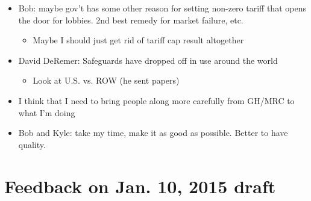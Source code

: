 \documentclass[12pt]{article}
\begin{document}
\begin{itemize}
\begin{itemize}
		\end{itemize}
	\item Bob: maybe gov't has some other reason for setting non-zero tariff that opens the door for lobbies. 2nd best remedy for market failure, etc.
		\begin{itemize}
			\item Maybe I should just get rid of tariff cap result altogether
		\end{itemize}
	\item David DeRemer: Safeguards have dropped off in use around the world
		\begin{itemize}
			\item Look at U.S. vs. ROW (he sent papers)
		\end{itemize}
	\item I think that I need to bring people along more carefully from GH/MRC to what I'm doing
	\item Bob and Kyle: take my time, make it as good as possible. Better to have quality.
\end{itemize}


\newpage
\section{Feedback on Jan. 10, 2015 draft}
\end{document}
